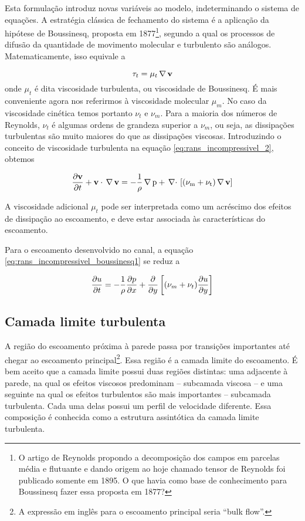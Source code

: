 Esta formulação introduz novas variáveis ao modelo, indeterminando o sistema de equações. A estratégia clássica de fechamento do sistema é a aplicação da hipótese de Boussinesq, proposta em 1877\cite{FREIRE02}\footnote{O artigo de Reynolds propondo a decomposição dos campos em parcelas média e flutuante e dando origem ao hoje chamado tensor de Reynolds foi publicado somente em 1895. O que havia como base de conhecimento para Boussinesq fazer essa proposta em 1877?}, segundo a qual os processos de difusão da quantidade de movimento molecular e turbulento são análogos. Matematicamente, isso equivale a

\begin{equation}
  \tau_t = \mu_t\,\rm \nabla\,\mathbf{v}
\end{equation}
onde $\mu_t$ é dita viscosidade turbulenta, ou viscosidade de Boussinesq. É mais conveniente agora nos referirmos à viscosidade molecular $\mu_m$. No caso da viscosidade cinética temos portanto $\nu_t$ e $\nu_m$. Para a maioria dos números de Reynolds, $\nu_t$ é algumas ordens de grandeza superior a $\nu_m$, ou seja, as dissipações turbulentas são muito maiores do que as dissipações viscosas. Introduzindo o conceito de viscosidade turbulenta na equação \ref{eq:rans_incompressivel_2}, obtemos

\begin{equation}
  \frac{\partial\mathbf{v}}{\partial t}+\mathbf{v}\cdot\,\rm \nabla\,\mathbf{v}=-\frac{1}{\rho}\,\rm \nabla\, p+{\,\nabla\cdot}\,\left[(\nu_m+\nu_t)\,\rm \nabla\,\mathbf{v}\right]
  \label{eq:rans_incompressivel_boussinesq1}
\end{equation}

A viscosidade adicional $\mu_t$ pode ser interpretada como um acréscimo dos efeitos de dissipação ao escoamento, e deve estar associada às características do escoamento.

Para o escoamento desenvolvido no canal, a equação \ref{eq:rans_incompressivel_boussinesq1} se reduz a

\begin{equation}
  \frac{\partial u}{\partial t}=-\frac{1}{\rho}\frac{\partial p}{\partial x}+\frac{\partial}{\partial y}\left[(\nu_m+\nu_t)\frac{\partial u}{\partial y}\right]
  \label{eq:rans_incompressivel_boussinesq2}
\end{equation}

\subsection{Camada limite turbulenta}

A região do escoamento próxima à parede passa por transições importantes até chegar ao escoamento principal\footnote{A expressão em inglês para o escoamento principal seria ``bulk flow''.}. Essa região é a camada limite do escoamento. É bem aceito que a camada limite possui duas regiões distintas: uma adjacente à parede, na qual os efeitos viscosos predominam -- subcamada viscosa -- e uma seguinte na qual os efeitos turbulentos são mais importantes -- subcamada turbulenta. Cada uma delas possui um perfil de velocidade diferente. Essa composição é conhecida como a estrutura assintótica da camada limite turbulenta.

